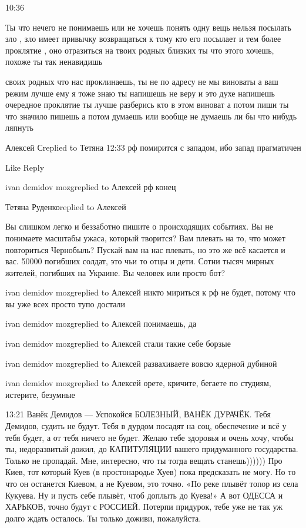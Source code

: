 10:36

Ты что нечего не понимаешь или не хочешь понять одну вещь нельзя посылать зло ,
зло имеет привычку возвращаться к тому кто его посылает и тем более проклятие ,
оно отразиться на твоих родных близких ты что этого хочешь, похоже ты так
ненавидишь

своих родных что нас проклинаешь, ты не по адресу не мы виноваты а ваш режим
лучше ему я тоже знаю ты напишешь не веру и это духе напишешь очередное
проклятие ты лучше разберись кто в этом виноват а потом пиши ты что значило
пишешь а потом думаешь или вообще не думаешь ли бы что нибудь ляпнуть

Алексей Сreplied to Тетяна
12:33
рф помирится с западом, ибо запад прагматичен

    Like
    Reply

ivan demidov mozgreplied to Алексей
рф конец

Тетяна Руденкоreplied to Алексей

Вы слишком легко и беззаботно пишите о происходящих событиях. Вы не понимаете
масштабы ужаса, который творится? Вам плевать на то, что может повториться
Чернобыль? Пускай вам на нас плевать, но это же всё касается и вас. 50000
погибших солдат, это чьи то отцы и дети. Сотни тысяч мирных жителей, погибших
на Украине. Вы человек или просто бот?

ivan demidov mozgreplied to Алексей
никто мириться к рф не будет, потому что вы уже всех просто тупо достали

ivan demidov mozgreplied to Алексей
понимаешь, да

ivan demidov mozgreplied to Алексей
стали такие себе борзые

ivan demidov mozgreplied to Алексей
развахиваете вовсю ядерной дубиной

ivan demidov mozgreplied to Алексей
орете, кричите, бегаете по студиям, истерите, безумные

13:21
Ванёк Демидов —
Успокойся БОЛЕЗНЫЙ,
ВАНЁК ДУРАЧЁК.
Тебя Демидов, судить не будут.
Тебя в дурдом посадят на соц, обеспечение и всё у тебя будет, а от тебя ничего не будет.
Желаю тебе здоровья и очень хочу, чтобы ты, недоразвитый дожил, до КАПИТУЛЯЦИИ вашего придуманного государства.
Только не пропадай.
Мне, интересно, что ты тогда вещать станешь))))))
Про Киев, тот который Куев (в простонародье Хуев)
пока предсказать не могу. Но то что он останется Киевом, а не Куевом, это точно.
«По реке плывёт топор из села Кукуева. Ну и пусть себе плывёт, чтоб доплыть до Куева!»
А вот ОДЕССА и ХАРЬКОВ, точно будут с РОССИЕЙ.
Потерпи придурок, тебе уже не так уж долго ждать осталось.
Ты только доживи, пожалуйста.

